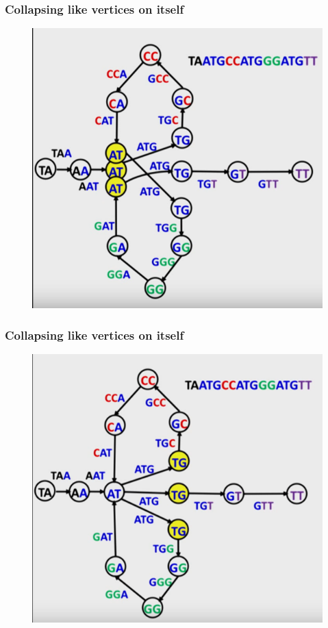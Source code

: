 \documentclass{beamer}
\begin{document}
\begin{frame}
\frametitle{Collapsing like vertices on itself}
\begin{figure}[h]
\includegraphics[scale = 0.4]{gluing2.png}
\end{figure}
\end{frame}


\begin{frame}
\frametitle{Collapsing like vertices on itself}
\begin{figure}[h]
\includegraphics[scale = 0.4]{gluing3.png}
\end{figure}
\end{frame}
\end{document}
